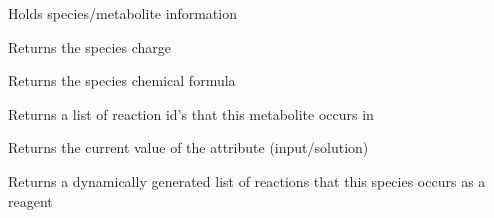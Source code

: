 \documentclass[a4paper,11pt,english]{sphinxmanual}
\begin{document}
\begin{fulllineitems}
\label{modules_doc:cbmpy.CBModel.Species}
Holds species/metabolite information

\begin{fulllineitems}
\label{modules_doc:cbmpy.CBModel.Species.getCharge}
Returns the species charge

\end{fulllineitems}


\begin{fulllineitems}
\label{modules_doc:cbmpy.CBModel.Species.getChemFormula}
Returns the species chemical formula

\end{fulllineitems}


\begin{fulllineitems}
\label{modules_doc:cbmpy.CBModel.Species.getReagentOf}
Returns a list of reaction id's that this metabolite occurs in

\end{fulllineitems}


\begin{fulllineitems}
\label{modules_doc:cbmpy.CBModel.Species.getValue}
Returns the current value of the attribute (input/solution)

\end{fulllineitems}


\begin{fulllineitems}
\label{modules_doc:cbmpy.CBModel.Species.isReagentOf}
Returns a dynamically generated list of reactions that this species occurs as a reagent


\end{fulllineitems}
\end{fulllineitems}
\end{document}
